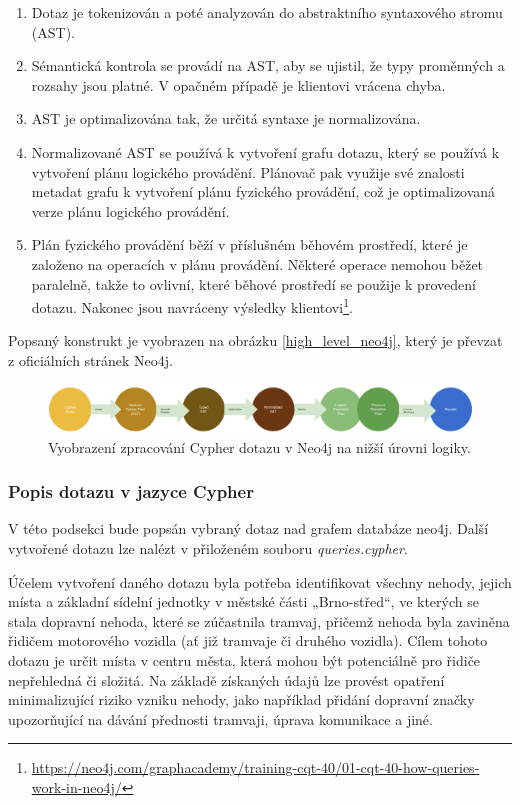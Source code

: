 \documentclass[a4paper, 11pt]{article}
\makeatletter
\newcommand\footnoteref[1]{\protected@xdef\@thefnmark{\ref{#1}}\@footnotemark}
\makeatother
\begin{document}
    \begin{enumerate}
        \item Dotaz je tokenizován a poté analyzován do abstraktního syntaxového stromu (AST).
        \item Sémantická kontrola se provádí na AST, aby se ujistil, že typy proměnných a rozsahy jsou platné. V opačném případě je klientovi vrácena chyba.
        \item AST je optimalizována tak, že určitá syntaxe je normalizována.
        \item Normalizované AST se používá k vytvoření grafu dotazu, který se používá k vytvoření plánu logického provádění. Plánovač pak využije své znalosti metadat grafu k vytvoření plánu fyzického provádění, což je optimalizovaná verze plánu logického provádění.
        \item Plán fyzického provádění běží v příslušném běhovém prostředí, které je založeno na operacích v plánu provádění. Některé operace nemohou běžet paralelně, takže to ovlivní, které běhové prostředí se použije k provedení dotazu. Nakonec jsou navráceny výsledky klientovi\footnote{\label{note2}\url{https://neo4j.com/graphacademy/training-cqt-40/01-cqt-40-how-queries-work-in-neo4j/}}.
    \end{enumerate}

    Popsaný konstrukt je vyobrazen na obrázku \ref{high_level_neo4j}, který je převzat z oficiálních stránek Neo4j\footnoteref{note2}.
    
    \begin{figure}[H]
        \centering        
        \includegraphics[width=1\textwidth]{img/low_level.png}
        \caption{Vyobrazení zpracování Cypher dotazu v Neo4j na nižší úrovni logiky\label{low_level_neo4j}.}
    \end{figure}

    \subsubsection{Popis dotazu v jazyce Cypher}
    V této podsekci bude popsán vybraný dotaz nad grafem databáze neo4j. Další vytvořené dotazu lze nalézt v přiloženém souboru \textit{queries.cypher}.

    Účelem vytvoření daného dotazu byla potřeba identifikovat všechny nehody, jejich místa a základní sídelní jednotky v městské části „Brno-střed“, ve kterých se stala dopravní nehoda, které se zúčastnila tramvaj, přičemž nehoda byla zaviněna řidičem motorového vozidla (ať již tramvaje či druhého vozidla). Cílem tohoto dotazu je určit místa v centru města, která mohou být potenciálně pro řidiče nepřehledná či složitá. Na základě získaných údajů lze provést opatření minimalizující riziko vzniku nehody, jako například přidání dopravní značky upozorňující na dávání přednosti tramvaji, úprava komunikace a jiné.
\end{document}
